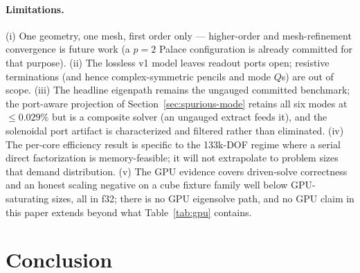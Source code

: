 \documentclass{anvil-paper}
\begin{document}
\paragraph{Limitations.}
(i) One geometry, one mesh, first order only --- higher-order and
mesh-refinement convergence is future work (a $p = 2$ Palace
configuration is already committed for that purpose). (ii) The lossless v1
model leaves readout ports open; resistive terminations (and hence
complex-symmetric pencils and mode $Q$s) are out of scope. (iii) The
headline eigenpath remains the ungauged committed benchmark; the
port-aware projection of Section~\ref{sec:spurious-mode} retains all six
modes at $\leq 0.029\%$ but is a composite solver (an ungauged extract
feeds it), and the solenoidal port artifact is characterized and filtered
rather than eliminated. (iv) The per-core efficiency result is specific
to the 133k-DOF regime where a serial direct factorization is
memory-feasible; it will not extrapolate to problem sizes that demand
distribution. (v) The GPU evidence covers driven-solve correctness and an
honest scaling negative on a cube fixture family well below
GPU-saturating sizes, all in f32; there is no GPU eigensolve path, and no
GPU claim in this paper extends beyond what
Table~\ref{tab:gpu} contains.

\section{Conclusion}
\label{sec:conclusion}
\end{document}
